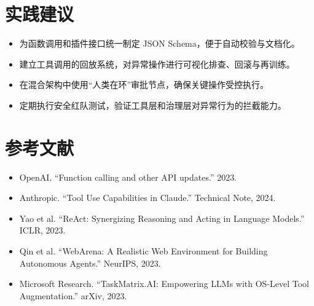 \documentclass[UTF8,zihao=-4]{ctexart}
\begin{document}
\section*{实践建议}
\begin{itemize}
  \item 为函数调用和插件接口统一制定 JSON Schema，便于自动校验与文档化。
  \item 建立工具调用的回放系统，对异常操作进行可视化排查、回滚与再训练。
  \item 在混合架构中使用“人类在环”审批节点，确保关键操作受控执行。
  \item 定期执行安全红队测试，验证工具层和治理层对异常行为的拦截能力。
\end{itemize}

\section*{参考文献}
\begin{itemize}
  \item OpenAI. ``Function calling and other API updates.'' 2023.
  \item Anthropic. ``Tool Use Capabilities in Claude.'' Technical Note, 2024.
  \item Yao et al. ``ReAct: Synergizing Reasoning and Acting in Language Models.'' ICLR, 2023.
  \item Qin et al. ``WebArena: A Realistic Web Environment for Building Autonomous Agents.'' NeurIPS, 2023.
  \item Microsoft Research. ``TaskMatrix.AI: Empowering LLMs with OS-Level Tool Augmentation.'' arXiv, 2023.
\end{itemize}
\end{document}
